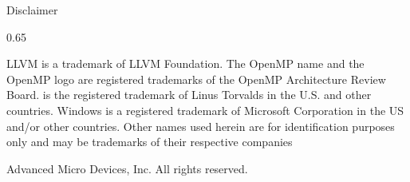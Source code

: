 \begin{frame}{Disclaimer}
\begin{scalepar}{0.65}
\medskip 

LLVM is a trademark of LLVM Foundation. The OpenMP name and the OpenMP logo are registered trademarks of the OpenMP Architecture Review Board. 
\Linux is the registered trademark of Linus Torvalds in the U.S. and other countries.
Windows is a registered trademark of Microsoft Corporation in the US and/or other countries.
Other names used herein are for identification purposes only and may be 
trademarks of their respective companies

\medskip

 Advanced Micro Devices, Inc. All rights reserved.
\end{scalepar}
\end{frame}

\folks

\setcounter{framenumber}{\thelastslidenum} %
